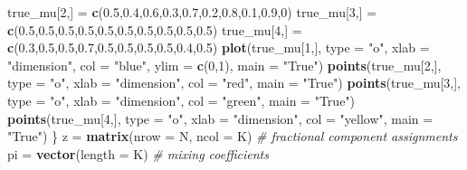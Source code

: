 \documentclass[]{article}
\newenvironment{Shaded}{\begin{snugshade}}{\end{snugshade}}
\newcommand{\KeywordTok}[1]{\textcolor[rgb]{0.13,0.29,0.53}{\textbf{#1}}}
\newcommand{\DataTypeTok}[1]{\textcolor[rgb]{0.13,0.29,0.53}{#1}}
\newcommand{\DecValTok}[1]{\textcolor[rgb]{0.00,0.00,0.81}{#1}}
\newcommand{\FloatTok}[1]{\textcolor[rgb]{0.00,0.00,0.81}{#1}}
\newcommand{\StringTok}[1]{\textcolor[rgb]{0.31,0.60,0.02}{#1}}
\newcommand{\CommentTok}[1]{\textcolor[rgb]{0.56,0.35,0.01}{\textit{#1}}}
\newcommand{\NormalTok}[1]{#1}
\begin{document}
\begin{Shaded}
\begin{Highlighting}[]
\NormalTok{true_mu[}\DecValTok{2}\NormalTok{,] =}\StringTok{ }\KeywordTok{c}\NormalTok{(}\FloatTok{0.5}\NormalTok{,}\FloatTok{0.4}\NormalTok{,}\FloatTok{0.6}\NormalTok{,}\FloatTok{0.3}\NormalTok{,}\FloatTok{0.7}\NormalTok{,}\FloatTok{0.2}\NormalTok{,}\FloatTok{0.8}\NormalTok{,}\FloatTok{0.1}\NormalTok{,}\FloatTok{0.9}\NormalTok{,}\DecValTok{0}\NormalTok{)}
\NormalTok{true_mu[}\DecValTok{3}\NormalTok{,] =}\StringTok{ }\KeywordTok{c}\NormalTok{(}\FloatTok{0.5}\NormalTok{,}\FloatTok{0.5}\NormalTok{,}\FloatTok{0.5}\NormalTok{,}\FloatTok{0.5}\NormalTok{,}\FloatTok{0.5}\NormalTok{,}\FloatTok{0.5}\NormalTok{,}\FloatTok{0.5}\NormalTok{,}\FloatTok{0.5}\NormalTok{,}\FloatTok{0.5}\NormalTok{,}\FloatTok{0.5}\NormalTok{)}
\NormalTok{true_mu[}\DecValTok{4}\NormalTok{,] =}\StringTok{ }\KeywordTok{c}\NormalTok{(}\FloatTok{0.3}\NormalTok{,}\FloatTok{0.5}\NormalTok{,}\FloatTok{0.5}\NormalTok{,}\FloatTok{0.7}\NormalTok{,}\FloatTok{0.5}\NormalTok{,}\FloatTok{0.5}\NormalTok{,}\FloatTok{0.5}\NormalTok{,}\FloatTok{0.5}\NormalTok{,}\FloatTok{0.4}\NormalTok{,}\FloatTok{0.5}\NormalTok{)}
\KeywordTok{plot}\NormalTok{(true_mu[}\DecValTok{1}\NormalTok{,], }\DataTypeTok{type =} \StringTok{"o"}\NormalTok{, }\DataTypeTok{xlab =} \StringTok{"dimension"}\NormalTok{, }\DataTypeTok{col =} \StringTok{"blue"}\NormalTok{,}
\DataTypeTok{ylim =} \KeywordTok{c}\NormalTok{(}\DecValTok{0}\NormalTok{,}\DecValTok{1}\NormalTok{), }\DataTypeTok{main =} \StringTok{"True"}\NormalTok{)}
\KeywordTok{points}\NormalTok{(true_mu[}\DecValTok{2}\NormalTok{,], }\DataTypeTok{type =} \StringTok{"o"}\NormalTok{, }\DataTypeTok{xlab =} \StringTok{"dimension"}\NormalTok{, }\DataTypeTok{col =} \StringTok{"red"}\NormalTok{,}
\DataTypeTok{main =} \StringTok{"True"}\NormalTok{)}
\KeywordTok{points}\NormalTok{(true_mu[}\DecValTok{3}\NormalTok{,], }\DataTypeTok{type =} \StringTok{"o"}\NormalTok{, }\DataTypeTok{xlab =} \StringTok{"dimension"}\NormalTok{, }\DataTypeTok{col =} \StringTok{"green"}\NormalTok{,}
\DataTypeTok{main =} \StringTok{"True"}\NormalTok{)}
\KeywordTok{points}\NormalTok{(true_mu[}\DecValTok{4}\NormalTok{,], }\DataTypeTok{type =} \StringTok{"o"}\NormalTok{, }\DataTypeTok{xlab =} \StringTok{"dimension"}\NormalTok{, }\DataTypeTok{col =} \StringTok{"yellow"}\NormalTok{,}
\DataTypeTok{main =} \StringTok{"True"}\NormalTok{)}
\NormalTok{\}}
\NormalTok{z =}\StringTok{ }\KeywordTok{matrix}\NormalTok{(}\DataTypeTok{nrow =}\NormalTok{ N, }\DataTypeTok{ncol =}\NormalTok{ K) }\CommentTok{# fractional component assignments}
\NormalTok{pi =}\StringTok{ }\KeywordTok{vector}\NormalTok{(}\DataTypeTok{length =}\NormalTok{ K) }\CommentTok{# mixing coefficients}

\end{Highlighting}
\end{Shaded}
\end{document}

